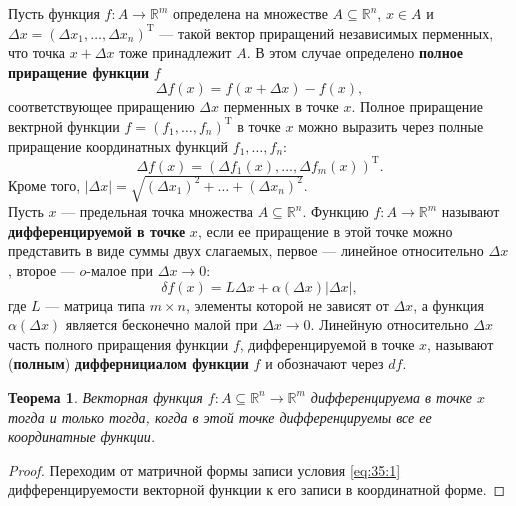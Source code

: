 \documentclass[12pt]{report}
\numberwithin{equation}{section}
\newtheorem{theorem}{Теорема}[section]
\begin{document}
Пусть функция $f : A \to \mathbb{R}^m$ определена  на множестве $A \subseteq \mathbb{R}^n$, $x \in A$ и $\Delta x = (\Delta x_1, \ldots, \Delta x_n)^{\mathrm{T}}$ --- такой вектор приращений независимых перменных, что точка $x + \Delta x$ тоже принадлежит $A$. В этом случае определено \textbf{полное приращение функции} $f$
\[ \Delta f(x) = f(x + \Delta x) - f(x),\]
соответствующее приращению $\Delta x$ перменных в точке $x$. Полное приращение вектрной функции $f = (f_1, \ldots, f_n)^{\mathrm{T}}$ в точке $x$ можно выразить через полные приращение координатных функций $f_1, \ldots, f_n$:
\begin{equation} \label{eq:35:1} \Delta f(x) = (\Delta f_1(x), \ldots, \Delta f_m(x))^{\mathrm{T}}. \end{equation}
Кроме того, $|\Delta x| = \sqrt{(\Delta x_1)^2 + \dots + (\Delta x_n)^2}$.\\

Пусть $x$ --- предельная точка множества $A \subseteq \mathbb{R}^n$. Функцию $f: A \to \mathbb{R}^m$ называют \textbf{дифференцируемой в точке} $x$, если ее приращение в этой точке можно представить в виде суммы двух слагаемых, первое --- линейное относительно $\Delta x$, второе --- $o$-малое при $\Delta x \to 0$:
\begin{equation} \label{eq:35:1}
\delta f(x) = L \Delta x + \alpha(\Delta x)|\Delta x|,
\end{equation}
где $L$ --- матрица типа $m \times n$, элементы которой не зависят от $\Delta x$, а функция $\alpha(\Delta x)$ является бесконечно малой при $\Delta x \to 0$. Линейную относительно $\Delta x$ часть полного приращения функции $f$, дифференцируемой в точке $x$, называют (\textbf{полным}) \textbf{диффернициалом функции} $f$ и обозначают через $df$.

\begin{theorem} \label{th:35:1}
Векторная функция $f : A \subseteq \mathbb{R}^n \to \mathbb{R}^m$ дифференцируема в точке $x$ тогда и только тогда, когда в этой точке дифференцируемы все ее координатные функции.
\end{theorem}
\begin{proof}
Переходим от матричной формы записи условия \eqref{eq:35:1} дифференцируемости векторной функции к его записи в координатной форме.
\end{proof}
\end{document}
